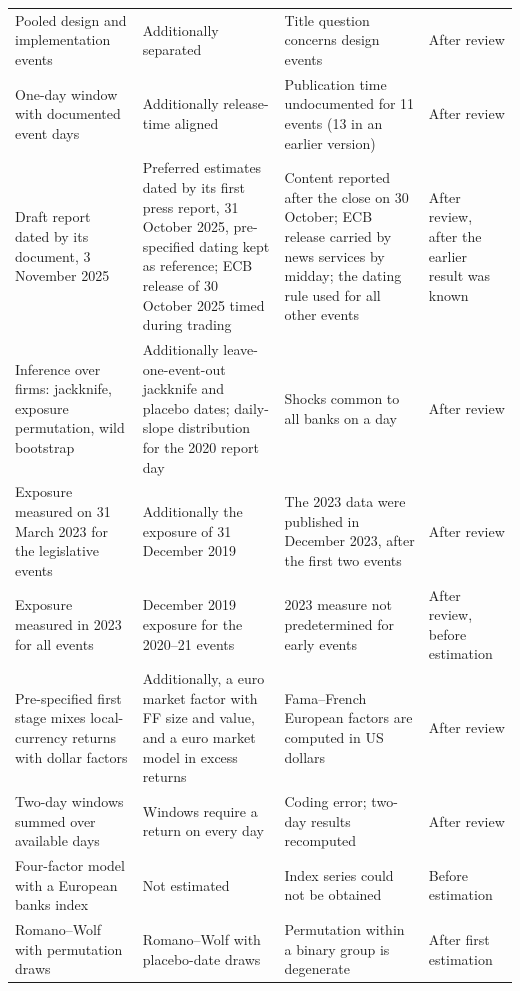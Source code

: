\documentclass[11pt]{article}
\theoremstyle{plain}\newtheorem{proposition}{Proposition}
\begin{document}
\begin{table}[ht]
\begin{threeparttable}
\begin{tabular}{P{3.6cm}P{3.6cm}P{4.2cm}P{2.2cm}}
Pooled design and implementation events & Additionally separated & Title question concerns design events & After review \\
One-day window with documented event days & Additionally release-time aligned & Publication time undocumented for 11 events (13 in an earlier version) & After review \\
Draft report dated by its document, 3 November 2025 & Preferred estimates dated by its first press report, 31 October 2025, pre-specified dating kept as reference; ECB release of 30 October 2025 timed during trading & Content reported after the close on 30 October; ECB release carried by news services by midday; the dating rule used for all other events & After review, after the earlier result was known \\
Inference over firms: jackknife, exposure permutation, wild bootstrap & Additionally leave-one-event-out jackknife and placebo dates; daily-slope distribution for the 2020 report day & Shocks common to all banks on a day & After review \\
Exposure measured on 31 March 2023 for the legislative events & Additionally the exposure of 31 December 2019 & The 2023 data were published in December 2023, after the first two events & After review \\
Exposure measured in 2023 for all events & December 2019 exposure for the 2020--21 events & 2023 measure not predetermined for early events & After review, before estimation \\
Pre-specified first stage mixes local-currency returns with dollar factors & Additionally, a euro market factor with FF size and value, and a euro market model in excess returns & Fama--French European factors are computed in US dollars & After review \\
Two-day windows summed over available days & Windows require a return on every day & Coding error; two-day results recomputed & After review \\
Four-factor model with a European banks index & Not estimated & Index series could not be obtained & Before estimation \\
Romano--Wolf with permutation draws & Romano--Wolf with placebo-date draws & Permutation within a binary group is degenerate & After first estimation \\
\bottomrule
\end{tabular}
\end{threeparttable}
\end{table}
\end{document}
